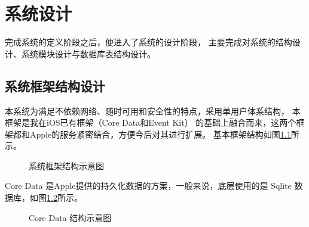 \chapter{系统设计}
完成系统的定义阶段之后，便进入了系统的设计阶段，
主要完成对系统的结构设计、系统模块设计与数据库表结构设计。
\section{系统框架结构设计}
本系统为满足不依赖网络、随时可用和安全性的特点，采用单用户体系结构，
本框架是我在iOS已有框架（Core Data和Event Kit）
的基础上融合而来，这两个框架都和Apple的服务紧密结合，方便今后对其进行扩展。
基本框架结构如图\ref{fig:level}所示。

\begin{figure}[!htbp]
	\centering
	\caption{系统框架结构示意图}
    \label{fig:level}
\end{figure}

Core Data 是Apple提供的持久化数据的方案，一般来说，底层使用的是 Sqlite 数据库，如图\ref{fig:core_data}所示。
\begin{figure}[!htbp]
	\centering
	\caption{Core Data 结构示意图}
    \label{fig:core_data}
\end{figure}

